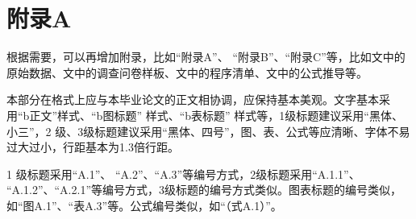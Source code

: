 \chapter*{附录A}

根据需要，可以再增加附录，比如“附录A”、 “附录B”、“附录C”等，比如文中的原始数据、文中的调查问卷样板、文中的程序清单、文中的公式推导等。

本部分在格式上应与本毕业论文的正文相协调，应保持基本美观。文字基本采用“b正文”样式、“b图标题” 样式、“b表标题” 样式等，1级标题建议采用“黑体、小三”，2 级、3级标题建议采用“黑体、四号”，图、表、公式等应清晰、字体不易过大过小，行距基本为1.3倍行距。 

1 级标题采用“A.1”、 “A.2”、“A.3”等编号方式，2级标题采用“A.1.1”、 “A.1.2”、“A.2.1”等编号方式，3级标题的编号方式类似。图表标题的编号类似，如“图A.1”、“表A.3”等。公式编号类似，如“（式A.1）”。

